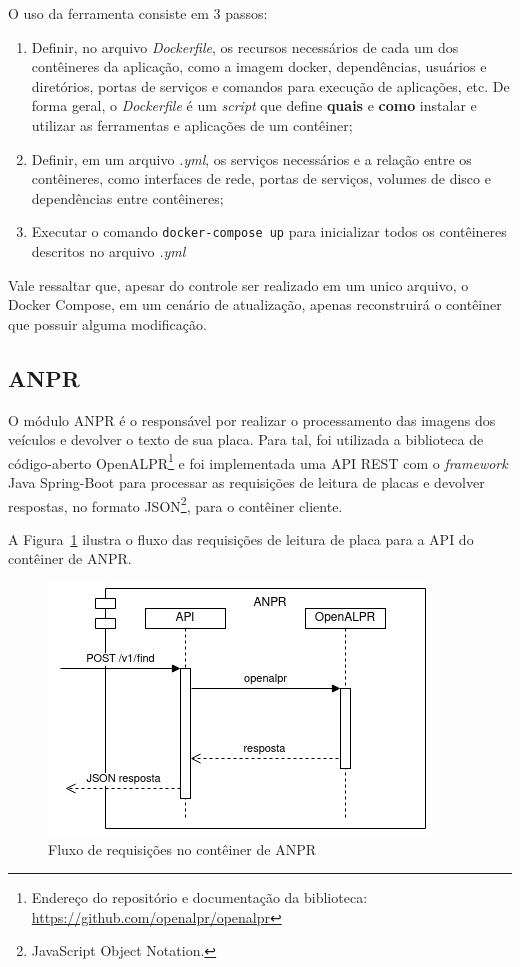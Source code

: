 \documentclass[12pt]{article}
\begin{document}
O uso da ferramenta consiste em 3 passos:

\begin{enumerate}
	\item Definir, no arquivo \textit{Dockerfile}, os recursos necessários de cada um dos contêineres da aplicação, como a imagem docker, dependências, usuários e diretórios, portas de serviços e comandos para execução de aplicações, etc. De forma geral, o \textit{Dockerfile} é um \textit{script} que define \textbf{quais} e \textbf{como} instalar e utilizar as ferramentas e aplicações de um contêiner;
	\item Definir, em um arquivo \textit{.yml}, os serviços necessários e a relação entre os contêineres, como interfaces de rede, portas de serviços, volumes de disco e dependências entre contêineres;
	\item Executar o comando \texttt{docker-compose up} para inicializar todos os contêineres descritos no arquivo \textit{.yml}
\end{enumerate}

Vale ressaltar que, apesar do controle ser realizado em um unico arquivo, o Docker Compose, em um cenário de atualização, apenas reconstruirá o contêiner que possuir alguma modificação.

\subsection{ANPR}

O módulo ANPR é o responsável por realizar o processamento das imagens dos veículos e devolver o texto de sua placa. Para tal, foi utilizada a biblioteca de código-aberto OpenALPR\footnote{Endereço do repositório e documentação da biblioteca: \url{https://github.com/openalpr/openalpr}} e foi implementada uma API REST com o \textit{framework} Java Spring-Boot para processar as requisições de leitura de placas e devolver respostas, no formato JSON\footnote{JavaScript Object Notation.}, para o contêiner cliente.

A Figura~\ref{fig:anpr4j-data} ilustra o fluxo das requisições de leitura de placa para a API do contêiner de ANPR.

\begin{figure}[ht]
	\centering
	\includegraphics[width=.6\textwidth]{anpr4j-data.jpg}
	\caption{Fluxo de requisições no contêiner de ANPR}
	\label{fig:anpr4j-data}
\end{figure}
\end{document}
